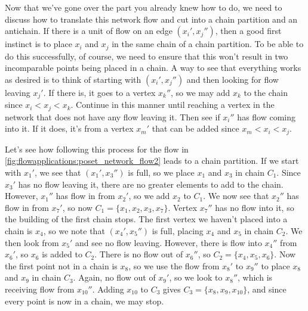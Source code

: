 Now that we've gone over the part you already knew how to do, we need
to discuss how to translate this network flow and cut into a chain
partition and an antichain. If there is a unit of flow on an edge
$(x_i',x_j'')$, then a good first instinct is to place $x_i$ and $x_j$
in the same chain of a chain partition. To be able to do this
successfully, of course, we need to ensure that this won't result in
two incomparable points being placed in a chain. A way to see that
everything works as desired is to think of starting with
$(x_i',x_j'')$ and then looking for flow leaving $x_j'$. If there is,
it goes to a vertex $x_k''$, so we may add $x_k$ to the chain since
$x_i<x_j<x_k$. Continue in this manner until reaching a vertex in the
network that does not have any flow leaving it. Then see if $x_i''$
has flow coming into it. If it does, it's from a vertex $x_m'$ that
can be added since $x_m<x_i<x_j$.

Let's see how following this process for the flow in
\autoref{fig:flowapplications:poset_network_flow2} leads to a chain
partition. If we start with $x_1'$, we see that $(x_1',x_3'')$ is
full, so we place $x_1$ and $x_3$ in chain $C_1$. Since $x_3'$ has no
flow leaving it, there are no greater elements to add to the
chain. However, $x_1''$ has flow in from $x_2'$, so we add $x_2$ to
$C_1$. We now see that $x_2''$ has flow in from $x_7'$, so now
$C_1=\{x_1,x_2,x_3,x_7\}$. Vertex $x_7''$ has no flow into it, so the
building of the first chain stops. The first vertex we haven't placed
into a chain is $x_4$, so we note that $(x_4',x_5'')$ is full, placing
$x_4$ and $x_5$ in chain $C_2$. We then look from $x_5'$ and see no
flow leaving. However, there is flow into $x_4''$ from $x_6'$, so
$x_6$ is added to $C_2$. There is no flow out of $x_6''$, so
$C_2=\{x_4,x_5,x_6\}$. Now the first point not in a chain is $x_8$, so
we use the flow from $x_8'$ to $x_9''$ to place $x_8$ and $x_9$ in
chain $C_3$. Again, no flow out of $x_9'$, so we look to $x_8''$,
which is receiving flow from $x_{10}''$. Adding $x_{10}$ to $C_3$
gives $C_3=\{x_8,x_9,x_{10}\}$, and since every point is now in a
chain, we may stop.

